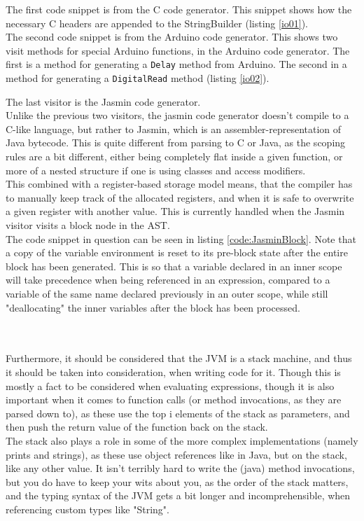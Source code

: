The first code snippet is from the C code generator. This snippet shows how the necessary C headers are appended to the StringBuilder (listing \ref{io01}).\\

\noindent\newline
The second code snippet is from the Arduino code generator. This shows two visit methods for special Arduino functions, in the Arduino code generator. The first is a method for generating a \texttt{Delay} method from Arduino. The second in a method for generating a \texttt{DigitalRead} method (listing \ref{io02}).

\noindent\newline
The last visitor is the Jasmin code generator.\\
Unlike the previous two visitors, the jasmin code generator doesn't compile to a C-like language, but rather to Jasmin, which is an assembler-representation of Java bytecode. This is quite different from parsing to C or Java, as the scoping rules are a bit different, either being completely flat inside a given function, or more of a nested structure if one is using classes and access modifiers.\\
This combined with a register-based storage model means, that the compiler has to manually keep track of the allocated registers, and when it is safe to overwrite a given register with another value. This is currently handled when the Jasmin visitor visits a block node in the AST.\\
The code snippet in question can be seen in listing \ref{code:JasminBlock}. Note that a copy of the variable environment is reset to its pre-block state after the entire block has been generated. This is so that a variable declared in an inner scope will take precedence when being referenced in an expression, compared to a variable of the same name declared previously in an outer scope, while still "deallocating" the inner variables after the block has been processed.

\\\\
Furthermore, it should be considered that the JVM is a stack machine, and thus it should be taken into consideration, when writing code for it. Though this is mostly a fact to be considered when evaluating expressions, though it is also important when it comes to function calls (or method invocations, as they are parsed down to), as these use the top i elements of the stack as parameters, and then push the return value of the function back on the stack.\\
The stack also plays a role in some of the more complex implementations (namely prints and strings), as these use object references like in Java, but on the stack, like any other value. It isn't terribly hard to write the (java) method invocations, but you do have to keep your wits about you, as the order of the stack matters, and the typing syntax of the JVM gets a bit longer and incomprehensible, when referencing custom types like "String".
\\\\

